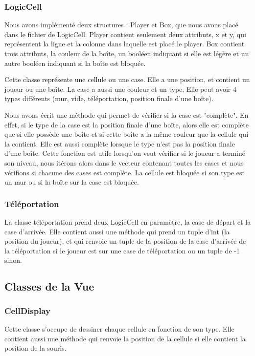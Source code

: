\documentclass[utf8]{article}
\begin{document}
\begin{large}
\subsubsection{LogicCell}
\indent
\par
Nous avons implémenté deux structures : Player et Box, que nous avons placé dans
le fichier de LogicCell. Player contient seulement deux attributs, x et y, qui
représentent la ligne et la colonne dans laquelle est placé le player. Box
contient trois attributs, la couleur de la boîte, un booléen indiquant si elle
est légère et un autre booléen indiquant si la boîte est bloquée.
\par
\indent
\par
Cette classe représente une cellule ou une case. Elle a une position, et
contient un joueur ou une boîte. La case a aussi une couleur et un type. Elle
peut avoir 4 types différents (mur, vide, téléportation, position finale d'une
boîte). 
\par
\indent
\par
Nous avons écrit une méthode qui permet de vérifier si la case est
"complète". En effet, si le type de la case est la position finale d'une boîte,
alors elle est complète que si elle possède une boîte et si cette boîte a la
même couleur que la cellule qui la contient. Elle est aussi complète lorsque le
type n'est pas la position finale d'une boîte. Cette fonction est utile
lorsqu'on veut vérifier si le joueur a terminé son niveau, nous itérons alors
dans le vecteur contenant toutes les cases et nous vérifions si chacune des
cases est complète. La cellule est bloquée si son type est un mur ou si la boîte
sur la case est bloquée.
\par
\subsubsection{Téléportation}
\indent
\par
La classe téléportation prend deux LogicCell en paramètre, la case de départ et
la case d'arrivée. Elle contient aussi une méthode qui prend un tuple d'int (la
position du joueur), et qui renvoie un tuple de la position de la case d'arrivée
de la téléportation si le joueur est sur une case de téléportation ou un tuple
de -1 sinon.
\par
\subsection{Classes de la Vue}
\subsubsection{CellDisplay}
\indent
\par
Cette classe s'occupe de dessiner chaque cellule en fonction de son type. Elle
contient aussi une méthode qui renvoie la position de la cellule si elle
contient la position de la souris.
\par

\end{large}
\end{document}
